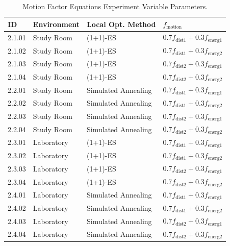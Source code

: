 \begin{table}[ht]
\centering
\caption{Motion Factor Equations Experiment Variable Parameters.}
\label{tab:motion_equations_params}
\begin{tabular}{@{}llll@{}}
\hline
    ID & Environment & Local Opt. Method & $f_{\text{motion}}$ \\
\hline
    2.1.01 & Study Room & (1+1)-ES & $0.7f_{\text{dist1}} + 0.3f_{\text{energ1}}$ \\
    2.1.02 & Study Room & (1+1)-ES & $0.7f_{\text{dist1}} + 0.3f_{\text{energ2}}$ \\
    2.1.03 & Study Room & (1+1)-ES & $0.7f_{\text{dist2}} + 0.3f_{\text{energ1}}$ \\
    2.1.04 & Study Room & (1+1)-ES & $0.7f_{\text{dist2}} + 0.3f_{\text{energ2}}$ \\
    \noalign{\smallskip}
    2.2.01 & Study Room & Simulated Annealing & $0.7f_{\text{dist1}} + 0.3f_{\text{energ1}}$ \\
    2.2.02 & Study Room & Simulated Annealing & $0.7f_{\text{dist1}} + 0.3f_{\text{energ2}}$ \\
    2.2.03 & Study Room & Simulated Annealing & $0.7f_{\text{dist2}} + 0.3f_{\text{energ1}}$ \\
    2.2.04 & Study Room & Simulated Annealing & $0.7f_{\text{dist2}} + 0.3f_{\text{energ2}}$ \\
    \noalign{\smallskip}
    2.3.01 & Laboratory & (1+1)-ES & $0.7f_{\text{dist1}} + 0.3f_{\text{energ1}}$ \\
    2.3.02 & Laboratory & (1+1)-ES & $0.7f_{\text{dist1}} + 0.3f_{\text{energ2}}$ \\
    2.3.03 & Laboratory & (1+1)-ES & $0.7f_{\text{dist2}} + 0.3f_{\text{energ1}}$ \\
    2.3.04 & Laboratory & (1+1)-ES & $0.7f_{\text{dist2}} + 0.3f_{\text{energ2}}$ \\
    \noalign{\smallskip}
    2.4.01 & Laboratory & Simulated Annealing & $0.7f_{\text{dist1}} + 0.3f_{\text{energ1}}$ \\
    2.4.02 & Laboratory & Simulated Annealing & $0.7f_{\text{dist1}} + 0.3f_{\text{energ2}}$ \\
    2.4.03 & Laboratory & Simulated Annealing & $0.7f_{\text{dist2}} + 0.3f_{\text{energ1}}$ \\
    2.4.04 & Laboratory & Simulated Annealing & $0.7f_{\text{dist2}} + 0.3f_{\text{energ2}}$ \\
\hline
\end{tabular}
\end{table}